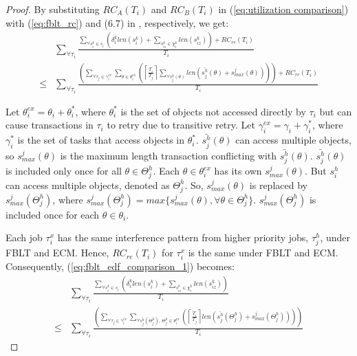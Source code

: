 \documentclass[a4paper,english]{article}
\newtheorem{proof}{Proof}
\begin{document}
\begin{proof}\normalfont

By substituting $RC_{A}(T_{i})$ and $RC_{B}(T_{i})$ in (\ref{eq:utilization comparison})
with (\ref{eq:fblt_rc}) and (6.7) in \cite{shambake_phd_proposal}, 
respectively, we get: 
\begin{eqnarray}
 & \sum_{\forall\tau_{i}}\frac{\sum_{\forall s_{i}^{k}\in s_{i}}\left(\delta_{i}^{k}len(s_{i}^{k})+\sum_{s_{iz}^k\in \chi_i^k} len(s_{iz}^{k})\right)+RC_{re}(T_{i})}{T_{i}}\label{eq:fblt_edf_comparison_1}\\
\le & \sum_{\forall\tau_{i}}\frac{\left(\sum_{\forall\tau_{j}\in\gamma_{i}^{ex}}\sum_{\theta\in\theta_{i}^{ex}}\left(\left\lceil \frac{T_{i}}{T_{j}}\right\rceil \sum_{\forall\bar{s_{j}^{h}}(\theta)}len\left(\bar{s_{j}^{h}}(\theta)+s_{max}^{j}(\theta)\right)\right)\right)+RC_{re}(T_{i})}{T_{i}}\nonumber 
\end{eqnarray}

Let $\theta_{i}^{ex}=\theta_{i}+\theta_{i}^{*}$, where $\theta_{i}^{*}$
is the set of objects not accessed directly by $\tau_{i}$ but can
cause transactions in $\tau_{i}$ to retry due to transitive retry.
Let $\gamma_{i}^{ex}=\gamma_{i}+\gamma_{i}^{*}$, where $\gamma_{i}^{*}$
is the set of tasks that access objects in $\theta_{i}^{*}$. $\bar{s_{j}^{h}}(\theta)$
can access multiple objects, so $s_{max}^{j}(\theta)$ is the maximum
length transaction conflicting with $\bar{s_{j}^{h}}(\theta)$. $\bar{s_{j}^{h}}(\theta)$ is included only once for all $\theta \in \Theta_j^h$. Each $\theta \in \theta_i^{ex}$ has its own $s_{max}^j(\theta)$. But $s_i^h$ can access multiple objects, denoted as $\Theta_j^h$. So, $s_{max}^j(\theta)$ is replaced by $s_{max}^j(\Theta_j^h)$, where $s_{max}^j(\Theta_j^h)=max\{s_{max}^j(\theta),\forall \theta \in \Theta_j^h\}$. $s_{max}^j(\Theta_j^h)$ is included once for each $\theta \in \theta_i$. 
 
Each job $\tau_i^x$ has the same interference pattern from higher priority jobs, $\tau_j^h$, under FBLT and ECM. Hence, $RC_{re}(T_i)$ for $\tau_i^x$ is the same under FBLT and ECM. Consequently, (\ref{eq:fblt_edf_comparison_1})
becomes:
\begin{eqnarray}
 & \sum_{\forall\tau_{i}}\frac{\sum_{\forall s_{i}^{k}\in s_{i}}\left(\delta_{i}^{k}len(s_{i}^{k})+\sum_{s_{iz}^k\in \chi_i^k} len(s_{iz}^{k})\right)}{T_{i}}\label{eq:fblt_edf_comparison_3}\\
\le & \sum_{\forall\tau_{i}}\frac{\left(\sum_{\forall\tau_{j}\in\gamma_{i}^{ex}}\sum_{\forall \bar{s_{j}^{h}}(\Theta_j^h),\,\Theta_j^h\in\theta_{i}^{ex}}\left(\left\lceil \frac{T_{i}}{T_{j}}\right\rceil len\left(\bar{s_{j}^{h}}(\Theta_j^h)+s_{max}^{j}(\Theta_j^h)\right)\right)\right)}{T_{i}}\nonumber 
\end{eqnarray}



\end{proof}
\end{document}
